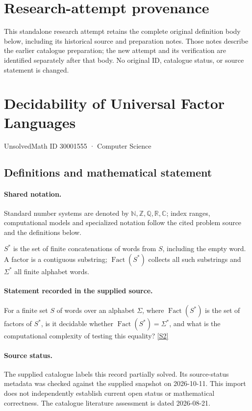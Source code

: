 \documentclass[11pt]{article}
\begin{document}
\section*{Research-attempt provenance}
This standalone research attempt retains the complete original definition body below,
including its historical source and preparation notes. Those notes describe the
earlier catalogue preparation; the new attempt and its verification are identified
separately after that body. No original ID, catalogue status, or source statement is changed.

\section{Decidability of Universal Factor Languages}\label{30001555}
{\small UnsolvedMath ID 30001555 · Computer Science}
\subsection{Definitions and mathematical statement}

\paragraph{Shared notation.}Standard number systems are denoted by $\mathbb N,\mathbb Z,\mathbb Q,\mathbb R,\mathbb C$; index ranges, computational models and specialized notation follow the cited problem source and the definitions below.


$S^*$ is the set of finite concatenations of words from $S$, including the empty word. A factor is a contiguous substring; $\operatorname{Fact}(S^*)$ collects all such substrings and $\Sigma^*$ all finite alphabet words.
\paragraph{Statement recorded in the supplied source.}
For a finite set $S$ of words over an alphabet $\Sigma$, where $\operatorname{Fact}(S^*)$ is the set of factors of $S^*$, is it decidable whether $\operatorname{Fact}(S^*)=\Sigma^*$, and what is the computational complexity of testing this equality? \href{https://doi.org/10.4171/owr/2010/37}{[S2]}
\paragraph{Source status.}
The supplied catalogue labels this record partially solved. Its source-status metadata was checked against the supplied snapshot on 2026-10-11. This import does not independently establish current open status or mathematical correctness. The catalogue literature assessment is dated 2026-08-21.
\end{document}
